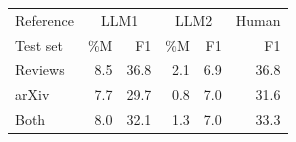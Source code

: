 \begin{tabular}{lrrrrr}
\toprule
Reference & \multicolumn{2}{c}{LLM1} & \multicolumn{2}{c}{LLM2} & Human \\
Test set & \%M & F1 & \%M & F1 & F1 \\
\midrule
Reviews & 8.5 & 36.8 & 2.1 & 6.9 & 36.8 \\
arXiv & 7.7 & 29.7 & 0.8 & 7.0 & 31.6 \\
Both & 8.0 & 32.1 & 1.3 & 7.0 & 33.3 \\
\bottomrule
\end{tabular}

